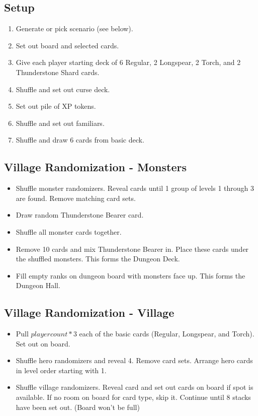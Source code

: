 \documentclass[12pt]{article}
\newenvironment{enumerateCustom}
{\begin{enumerate}
  \setlength{\itemsep}{1pt}
  \setlength{\parskip}{0pt}
  \setlength{\parsep}{0pt}}
{\end{enumerate}}
\newenvironment{itemizeCustom}
{\begin{itemize}
  \setlength{\itemsep}{1pt}
  \setlength{\parskip}{0pt}
  \setlength{\parsep}{0pt}}
{\end{itemize}}
\begin{document}
\begin{multicols*}{2}

\section*{Setup}
\begin{enumerateCustom}
	\item Generate or pick scenario (see below). 
	\item Set out board and selected cards.
	\item Give each player starting deck of 6 Regular, 2 Longspear, 2 Torch, and 2 Thunderstone Shard cards.
	\item Shuffle and set out curse deck.
	\item Set out pile of XP tokens.
	\item Shuffle and set out familiars.
	\item Shuffle and draw 6 cards from basic deck.
\end{enumerateCustom}

\subsection*{Village Randomization - Monsters}
\begin{itemizeCustom}
	\item Shuffle monster randomizers. Reveal cards until 1 group of levels 1 through 3 are found. Remove matching card sets.
	\item Draw random Thunderstone Bearer card.
	\item Shuffle all monster cards together.
	\item Remove 10 cards and mix Thunderstone Bearer in. Place these cards under the shuffled monsters. This forms the Dungeon Deck.
	\item Fill empty ranks on dungeon board with monsters face up. This forms the Dungeon Hall.
\end{itemizeCustom}

\subsection*{Village Randomization - Village}
\begin{itemizeCustom}
	\item Pull $player count * 3$ each of the basic cards (Regular, Longspear, and Torch). Set out on board.
	\item Shuffle hero randomizers and reveal 4. Remove card sets. Arrange hero cards in level order starting with 1.
	\item Shuffle village randomizers. Reveal card and set out cards on board if spot is available. If no room on board for card type, skip it. Continue until 8 stacks have been set out. (Board won't be full)
\end{itemizeCustom}


\end{multicols*}
\end{document}
